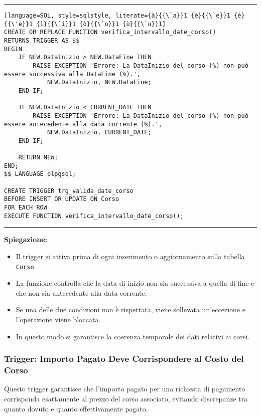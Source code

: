\noindent\rule{\textwidth}{0.4pt}
\begin{lstlisting}[language=SQL, style=sqlstyle, literate={à}{{\`a}}1 {è}{{\`e}}1 {é}{{\'e}}1 {ì}{{\`i}}1 {ò}{{\`o}}1 {ù}{{\`u}}1]
CREATE OR REPLACE FUNCTION verifica_intervallo_date_corso()
RETURNS TRIGGER AS $$
BEGIN
    IF NEW.DataInizio > NEW.DataFine THEN
        RAISE EXCEPTION 'Errore: La DataInizio del corso (%) non può essere successiva alla DataFine (%).',
            NEW.DataInizio, NEW.DataFine;
    END IF;

    IF NEW.DataInizio < CURRENT_DATE THEN
        RAISE EXCEPTION 'Errore: La DataInizio del corso (%) non può essere antecedente alla data corrente (%).',
            NEW.DataInizio, CURRENT_DATE;
    END IF;

    RETURN NEW;
END;
$$ LANGUAGE plpgsql;

CREATE TRIGGER trg_valida_date_corso
BEFORE INSERT OR UPDATE ON Corso
FOR EACH ROW
EXECUTE FUNCTION verifica_intervallo_date_corso();
\end{lstlisting}
\noindent\rule{\textwidth}{0.4pt}

\textbf{Spiegazione:}
\begin{itemize}
    \item Il trigger si attiva prima di ogni inserimento o aggiornamento sulla tabella \texttt{Corso}.
    \item La funzione controlla che la data di inizio non sia successiva a quella di fine e che non sia antecedente alla data corrente.
    \item Se una delle due condizioni non è rispettata, viene sollevata un'eccezione e l'operazione viene bloccata.
    \item In questo modo si garantisce la coerenza temporale dei dati relativi ai corsi.
\end{itemize}

\subsubsection{Trigger: Importo Pagato Deve Corrispondere al Costo del Corso}

Questo trigger garantisce che l'importo pagato per una richiesta di pagamento corrisponda esattamente al prezzo del corso associato, evitando discrepanze tra quanto dovuto e quanto effettivamente pagato.

